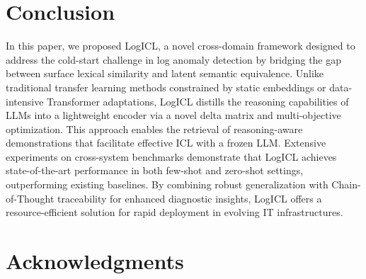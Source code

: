 \documentclass[lettersize,journal]{IEEEtran}
\begin{document}
\section{Conclusion}
In this paper, we proposed LogICL, a novel cross-domain framework designed to address the cold-start challenge in log anomaly detection by bridging the gap between surface lexical similarity and latent semantic equivalence. Unlike traditional transfer learning methods constrained by static embeddings or data-intensive Transformer adaptations, LogICL distills the reasoning capabilities of LLMs into a lightweight encoder via a novel delta matrix and multi-objective optimization. This approach enables the retrieval of reasoning-aware demonstrations that facilitate effective ICL with a frozen LLM. Extensive experiments on cross-system benchmarks demonstrate that LogICL achieves state-of-the-art performance in both few-shot and zero-shot settings, outperforming existing baselines. 
By combining robust generalization with Chain-of-Thought traceability for enhanced diagnostic insights, LogICL offers a resource-efficient solution for rapid deployment in evolving IT infrastructures.

\section*{Acknowledgments}




{
}
\end{document}
